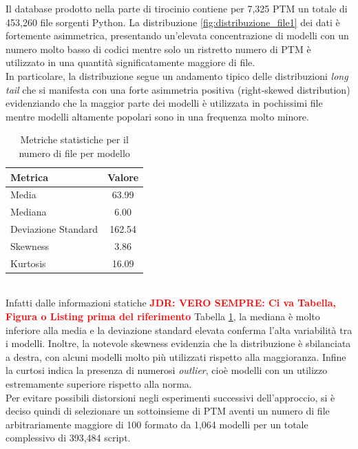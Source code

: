 \documentclass{article}
\newcommand{\JDR}[1]{\textbf{\textcolor{red}{JDR: {#1}}}}
\begin{document}
Il database prodotto nella parte di tirocinio contiene per 7,325 PTM un totale di 453,260 file sorgenti Python. La distribuzione \ref{fig:distribuzione_file1} dei dati è fortemente asimmetrica, presentando un'elevata concentrazione di modelli con un numero molto basso di codici mentre solo un ristretto numero di PTM è utilizzato in una quantità significatamente maggiore di file.\\
In particolare, la distribuzione segue un andamento tipico delle distribuzioni \textit{long tail} che si manifesta con una forte asimmetria positiva (right-skewed distribution) evidenziando che la maggior parte dei modelli è utilizzata in pochissimi file mentre modelli altamente popolari sono in una frequenza molto minore.\\
\begin{table}[h]
    \centering
    \begin{tabular}{|l|c|}
        \hline
        \textbf{Metrica} & \textbf{Valore} \\
        \hline
        Media & 63.99 \\
        Mediana & 6.00 \\
        Deviazione Standard & 162.54 \\
        Skewness & 3.86 \\
        Kurtosis & 16.09 \\
        \hline
    \end{tabular}
    \caption{Metriche statistiche per il numero di file per modello}
    \label{tab:metriche_file_modello1}
\end{table}\\
Infatti dalle informazioni statiche \JDR{VERO SEMPRE: Ci va Tabella, Figura o Listing prima del riferimento} Tabella \ref{tab:metriche_file_modello1}, la mediana è molto inferiore alla media e la deviazione standard elevata conferma l'alta variabilità tra i modelli. Inoltre, la notevole skewness evidenzia che la distribuzione è sbilanciata a destra, con alcuni modelli molto più utilizzati rispetto alla maggioranza. Infine la curtosi indica la presenza di numerosi \textit{outlier}, cioè modelli con un utilizzo estremamente superiore rispetto alla norma.\\
Per evitare possibili distorsioni negli esperimenti successivi dell'approccio, si è deciso quindi di selezionare un sottoinsieme di PTM aventi un numero di file arbitrariamente maggiore di 100 formato da 1,064 modelli per un totale complessivo di 393,484 script.\\
\end{document}

